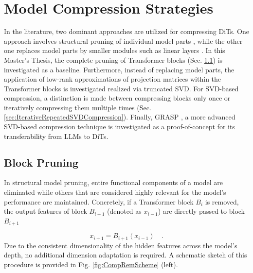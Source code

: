 \section{Model Compression Strategies}
\label{sec:StructuralCompressionStrategy}
In the literature, two dominant approaches are utilized for compressing \gls{DiT}s. One approach involves structural pruning of individual model parts \cite{flux1-lite,flux_mini_2024}, while the other one replaces model parts by smaller modules such as linear layers \cite{FastFlux,PPCL}. In this Master's Thesis, the complete pruning of Transformer blocks (Sec. \ref{sec:MethodBlockRemoval}) is investigated as a baseline. Furthermore, instead of replacing model parts, the application of low-rank approximations of projection matrices within the Transformer blocks is investigated realized via truncated \gls{SVD}. For \gls{SVD}-based compression, a distinction is made between compressing blocks only once or iteratively compressing them multiple times (Sec. \ref{sec:IterativeRepeatedSVDCompression}). Finally, \gls{GRASP} \cite{GRASP}, a more advanced \gls{SVD}-based compression technique is investigated as a proof-of-concept for its transferability from \gls{LLM}s to \gls{DiT}s.


\subsection{Block Pruning}
\label{sec:MethodBlockRemoval}
In structural model pruning, entire functional components of a model are eliminated \cite{Bksdm, Laptop, Koala} while others that are considered highly relevant for the model's performance are maintained. Concretely, if a Transformer block $B_i$ is removed, the output features of block $B_{i-1}$ (denoted as $x_{i-1}$) are directly passed to block $B_{i+1}$

\begin{equation}
x_{i+1} = B_{i+1}(x_{i-1}) \quad.
\end{equation}
Due to the consistent dimensionality of the hidden features across the model's depth, no additional dimension adaptation is required. A schematic sketch of this procedure is provided in Fig. \ref{fig:CompRemScheme} (left).

